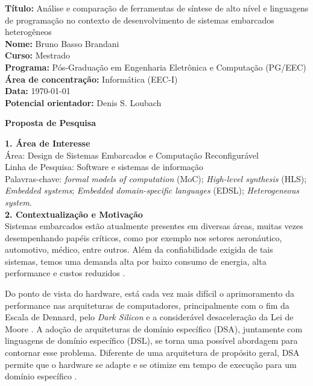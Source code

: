 \noindent
\textbf{Título:} Análise e comparação de ferramentas de síntese de alto nível e linguagens de programação no contexto de desenvolvimento de sistemas embarcados heterogêneos\\
\textbf{Nome:} Bruno Basso Brandani \\
\textbf{Curso:} Mestrado \\
\textbf{Programa:} Pós-Graduação em Engenharia Eletrônica e Computação (PG/EEC) \\
\textbf{Área de concentração:} Informática (EEC-I) \\
\textbf{Data:} \today \\
\textbf{Potencial orientador:} Denis S. Loubach \\

\centerline{\textbf{Proposta de Pesquisa}}
\centerline{}

\noindent
\textbf{1. Área de Interesse}\\
\noindent
Área: Design de Sistemas Embarcados e Computação Reconfigurável\\
Linha de Pesquisa: Software e sistemas de informação\\
Palavras-chave: \emph{formal models of computation} (MoC); \emph{High-level synthesis} (HLS); \emph{Embedded systems}; \emph{Embedded domain-specific languages} (EDSL); \emph{Heterogeneous system}.\\

\noindent
\textbf{2. Contextualização e Motivação}\\
\noindent
Sistemas embarcados estão atualmente presentes em diversas áreas, muitas vezes desempenhando papéis críticos, como por exemplo nos setores aeronáutico, automotivo, médico, entre outros. Além da confiabilidade exigida de tais sistemas, temos uma demanda alta por baixo consumo de energia, alta performance e custos reduzidos \cite{Horita}.

\noindent
Do ponto de vista do hardware, está cada vez mais difícil o aprimoramento da performance nas arquiteturas de computadores, principalmente com o fim da Escala de Dennard, pelo \emph{Dark Silicon} e a considerável desaceleração da Lei de Moore \cite{Loubach2022a}. A adoção de arquiteturas de domínio específico (DSA), juntamente com linguagens de domínio específico (DSL), se torna uma possível abordagem para contornar esse problema. Diferente de uma arquitetura de propósito geral, DSA permite que o hardware se adapte e se otimize em tempo de execução para um domínio específico \cite{Loubach2019a}.

